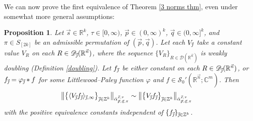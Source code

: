 \documentclass[11pt, reqno]{amsart}
\newtheorem{proposition}[theorem]{Proposition}
\theoremstyle{definition}
\theoremstyle{remark}
\numberwithin{equation}{section}
\newcommand{\C}{\mathbb C}
\newcommand{\D}{\mathscr D}
\newcommand{\R}{\mathbb R}
\newcommand{\Sc}{\mathscr S}
\newcommand{\Z}{\mathbb Z}
\newcommand{\vj}{\vec{\textit{\j}}}
\newcommand{\vn}{\vec n}
\newcommand{\vp}{\vec p}
\newcommand{\vq}{\vec q}
\newcommand{\vs}{\vec s}
\newcommand{\aatau}{\dot{\alpha}^{\vs,\tau}_{\vp,\vq,\pi}}
\newcommand{\Ave}[3]{\langle#1\rangle_{#2,#3}}
\newcommand{\bNorm}[2]{\big\|#1\big\|_{#2}}
\begin{document}
We can now prove the first equivalence of Theorem \ref{3 norms thm}, even under somewhat more general assumptions:

\begin{proposition}\label{sup vs ave}
Let $\vs\in\R^k$, $\tau\in[0,\infty)$, $\vp\in(0,\infty)^k$, $\vq\in(0,\infty]^k$,
and $\pi\in S_{[2k]}$ be an admissible permutation of $(\vp,\vq)$.
Let each $V_{\vj}$ take a constant value $V_R$ on each $R\in\D_{\vj}(\R^{\vn})$, where the sequence $\{V_R\}_{R\in\D(\R^{\vn})}$ is weakly doubling (Definition \ref{doubling}).
Let $f_{\vj}$ be either constant on each $R\in\D_{\vj}(\R^{\vn})$, or $f_{\vj}=\varphi_{\vj}*f$ for some Littlewood--Paley function $\varphi$ and $f\in\Sc_0'(\R^{\vn};\C^m)$.
Then
\begin{equation*}
\bNorm{ \big\{ \Ave{V_{\vj}f_{\vj}}{\vj}{\infty} \big\}_{\vj\in\Z^k} }{\aatau}
\sim\bNorm{ \big\{ V_{\vj}f_{\vj} \big\}_{\vj\in\Z^k} }{\aatau}
\end{equation*}
with the positive equivalence constants independent of
$\{f_{\vj}\}_{\vj\in\Z^k}$.
\end{proposition}
\end{document}

